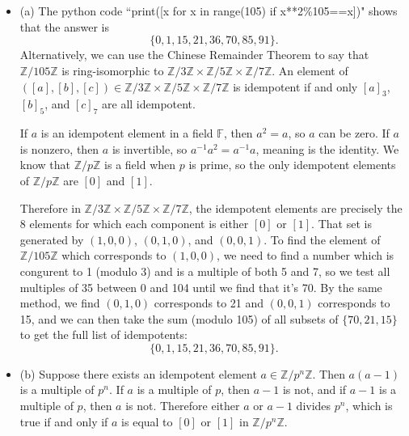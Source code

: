 \documentclass[12pt]{article}
\begin{document}
\section{}
\noindent{}\bigskip\par
\begin{itemize}
    \item (a) The python code ``print([x for x in range(105) if x**2\%105==x])" shows that the answer is
        \[ \{0, 1, 15, 21, 36, 70, 85, 91 \}. \]
        Alternatively, we can use the Chinese Remainder Theorem to say that $ \mathbb{Z}/105\mathbb{Z}$ is ring-isomorphic to $ \mathbb{Z}/3\mathbb{Z} \times \mathbb{Z}/5\mathbb{Z} \times \mathbb{Z}/7\mathbb{Z}$. An element of $([a], [b], [c]) \in \mathbb{Z}/3\mathbb{Z} \times \mathbb{Z}/5\mathbb{Z} \times \mathbb{Z}/7\mathbb{Z}$ is idempotent if and only $[a]_3$, $[b]_5$, and $[c]_7$ are all idempotent.
        \par
        If $a$ is an idempotent element in a field $\mathbb{F}$, then $a^2=a$, so $a$ can be zero. If $a$ is nonzero, then $a$ is invertible, so $a^{-1}a^2=a^{-1}a$, meaning is the identity. We know that $ \mathbb{Z}/p\mathbb{Z}$ is a field when $p$ is prime, so the only idempotent elements of $ \mathbb{Z}/p\mathbb{Z}$ are $[0]$ and $[1]$.
        \par
        Therefore in $\mathbb{Z}/3\mathbb{Z} \times \mathbb{Z}/5\mathbb{Z} \times \mathbb{Z}/7\mathbb{Z}$, the idempotent elements are precisely the 8 elements for which each component is either $[0]$ or $[1]$. That set is generated by $(1,0,0)$, $(0,1,0)$, and $(0,0,1)$. To find the element of $ \mathbb{Z}/105\mathbb{Z}$ which corresponds to $(1,0,0)$, we need to find a number which is congurent to 1 (modulo 3) and is a multiple of both 5 and 7, so we test all multiples of 35 between 0 and 104 until we find that it's 70. By the same method, we find $(0,1,0)$ corresponds to 21 and $(0,0,1)$ corresponds to 15, and we can then take the sum (modulo 105) of all subsets of $\{70,21,15\}$ to get the full list of idempotents:
        \[ \{0, 1, 15, 21, 36, 70, 85, 91 \}. \]
        \par
    \item (b) Suppose there exists an idempotent element $a \in \mathbb{Z}/p^n\mathbb{Z}$. Then $a(a-1)$ is a multiple of $p^n$. If $a$ is a multiple of $p$, then $a-1$ is not, and if $a-1$ is a multiple of $p$, then $a$ is not. Therefore either $a$ or $a-1$ divides $p^n$, which is true if and only if $a$ is equal to $[0]$ or $[1]$ in $ \mathbb{Z}/p^n\mathbb{Z}$.
\end{itemize}
\end{document}
